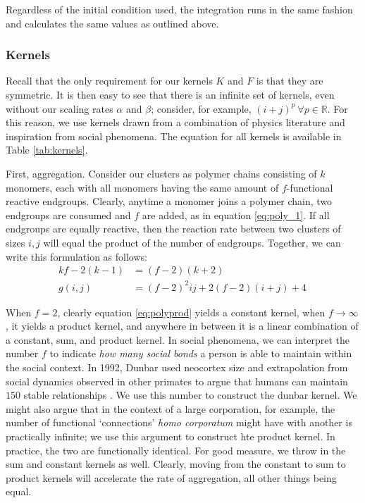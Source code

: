 \documentclass[fleqn,10pt]{wlscirep}
\begin{document}
Regardless of the initial condition used, the integration runs in the same fashion and calculates the same values as outlined above.

\subsubsection*{Kernels}

Recall that the only requirement for our kernels $ K $  and $ F $ is that they are symmetric.
It is then easy to see that there is an infinite set of kernels, even without our scaling rates $ \alpha $ and $ \beta $; consider, for example, $ (i+j)^p \ \forall p \in \mathbb{R}$.
For this reason, we use kernels drawn from a combination of physics literature and inspiration from social phenomena.
The equation for all kernels is available in Table \ref{tab:kernels}.

First, aggregation.
Consider our clusters as polymer chains consisting of $ k $ monomers, each with all monomers having the same amount of $ f $-functional reactive endgroups.
Clearly, anytime a monomer joins a polymer chain, two endgroups are consumed and $ f $ are added, as in equation \eqref{eq:poly_1}.
If all endgroups are equally reactive, then the reaction rate between two clusters of sizes $ i,j $ will equal the product of the number of endgroups.
Together, we can write this formulation as follows:
\begin{align}
    kf - 2(k - 1) & = (f - 2) (k + 2) \label{eq:poly_1}                        \\
    g(i, j)       & = (f - 2)^2 ij + 2(f - 2)(i + j) + 4\, \label{eq:polyprod}
\end{align}

When $ f=2 $, clearly equation \eqref{eq:polyprod} yields a constant kernel, when $ f \to \infty $, it yields a product kernel, and anywhere in between it is a linear combination of a constant, sum, and product kernel.
In social phenomena, we can interpret the number $ f $ to indicate \textit{how many social bonds} a person is able to maintain within the social context.
In 1992, Dunbar used neocortex size and extrapolation from social dynamics observed in other primates to argue that humans can maintain $ 150 $ stable relationships \cite{dunbarNeocortexSizeConstraint1992}.
We use this number to construct the \textcolor{dunbar}{dunbar} kernel.
We might also argue that in the context of a large corporation, for example, the number of functional `connections' \textit{homo corporatum} might have with another is practically infinite; we use this argument to construct hte \textcolor{product}{product} kernel.
In practice, the two are functionally identical.
For good measure, we throw in the \textcolor{sum}{sum} and \textcolor{constant}{constant} kernels as well.
Clearly, moving from the constant to sum to product kernels will accelerate the rate of aggregation, all other things being equal.
\end{document}
